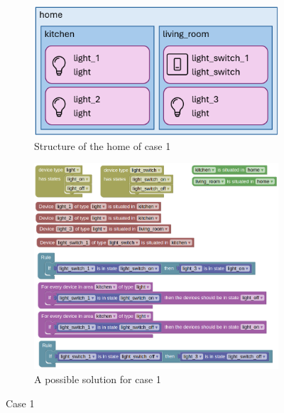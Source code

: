 \documentclass[11pt,a4paper]{report}
\begin{document}
\begin{figure}[htbp]
    \centering
    \begin{subfigure}[b]{0.6\linewidth}
        \centering
        \includegraphics[width=\linewidth]{images/case_1.png}
        \caption{Structure of the home of case 1}
        \label{fig:case_1}
    \end{subfigure}
    \hfill
    \begin{subfigure}[b]{1\linewidth}
        \centering
        \includegraphics[width=\linewidth]{images/case_1_homy.png}
        \caption{A possible solution for case 1}
        \label{fig:case_1_solution}
    \end{subfigure}
    \caption{Case 1}
    \label{fig:CASE_1}
\end{figure}
\end{document}
